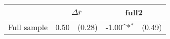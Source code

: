 {
\def\sym#1{\ifmmode^{#1}\else\(^{#1}\)\fi}
\begin{tabular*}{.65\hsize}{@{\hskip\tabcolsep\extracolsep\fill}l*{2}{lc}}
\toprule
                &\multicolumn{2}{c}{$\Delta \bar{r}$}&\multicolumn{2}{c}{full2}   \\
\midrule
Full sample     &     0.50         &   (0.28)&    -1.00\sym{*}  &   (0.49)\\
\bottomrule
\end{tabular*}
}

